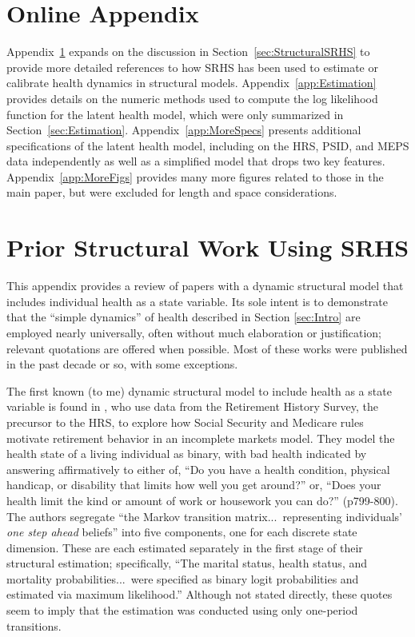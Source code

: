 \documentclass[12pt,pdftex,letterpaper]{article}
\begin{document}
\setcounter{table}{3}

\setcounter{figure}{10}

\setcounter{equation}{7}

\appendix

\section*{Online Appendix}

Appendix~\ref{app:LitQuotes} expands on the discussion in Section~\ref{sec:StructuralSRHS} to provide more detailed references to how SRHS has been used to estimate or calibrate health dynamics in structural models. Appendix~\ref{app:Estimation} provides details on the numeric methods used to compute the log likelihood function for the latent health model, which were only summarized in Section~\ref{sec:Estimation}. Appendix~\ref{app:MoreSpecs} presents additional specifications of the latent health model, including on the HRS, PSID, and MEPS data independently as well as a simplified model that drops two key features. Appendix~\ref{app:MoreFigs} provides many more figures related to those in the main paper, but were excluded for length and space considerations.


\section{Prior Structural Work Using SRHS}\label{app:LitQuotes}

This appendix provides a review of papers with a dynamic structural model that includes individual health as a state variable.  Its sole intent is to demonstrate that the ``simple dynamics'' of health described in Section \ref{sec:Intro} are employed nearly universally, often without much elaboration or justification; relevant quotations are offered when possible.  Most of these works were published in the past decade or so, with some exceptions.

The first known (to me) dynamic structural model to include health as a state variable is found in \cite{RustPhelan97}, who use data from the Retirement History Survey, the precursor to the HRS, to explore how Social Security and Medicare rules motivate retirement behavior in an incomplete markets model.  They model the health state of a living individual as binary, with bad health indicated by answering affirmatively to either of, ``Do you have a health condition, physical handicap, or disability that limits how well you get around?'' or, ``Does your health limit the kind or amount of work or housework you can do?'' (p799-800).  The authors segregate ``the Markov transition matrix...\ representing individuals' \textit{one step ahead} beliefs'' into five components, one for each discrete state dimension.  These are each estimated separately in the first stage of their structural estimation; specifically, ``The marital status, health status, and mortality probabilities...\ were specified as binary logit probabilities and estimated via maximum likelihood.''  Although not stated directly, these quotes seem to imply that the estimation was conducted using only one-period transitions.
\end{document}
